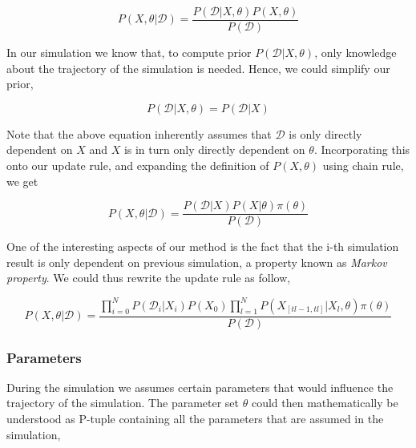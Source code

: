 \documentclass{bioinfo}
\begin{document}
\begin{equation}
P(X, \theta | \mathcal{D}) = \frac{P(\mathcal{D} | X, \theta)  P(X, \theta)}{P(\mathcal{D})}\label{eq:04}
\end{equation}

In our simulation we know that, to compute prior $P(\mathcal{D} | X, \theta)$, only knowledge about the trajectory of the simulation is needed. Hence, we could simplify our prior,

\begin{equation}
P(\mathcal{D} | X, \theta) = P(\mathcal{D} | X)\label{eq:05}
\end{equation}

Note that the above equation inherently assumes that $\mathcal{D}$ is only directly dependent on $X$ and $X$ is in turn only directly dependent on $\theta$. Incorporating this onto our update rule, and expanding the definition of $P(X, \theta)$ using chain rule, we get

\begin{equation}
P(X, \theta | \mathcal{D}) = \frac{P(\mathcal{D} | X)  P(X | \theta) \pi(\theta)}{P(\mathcal{D})}\label{eq:06}
\end{equation}

One of the interesting aspects of our method is the fact that the i-th simulation result is only dependent on previous simulation, a property known as \textit{Markov property}. We could thus rewrite the update rule as follow,



\begin{equation}
P(X, \theta | \mathcal{D}) = \frac{\prod_{i=0}^{N} P(\mathcal{D}_i | X_i) P(X_0) \prod_{l=1}^{N} P(X_{[tl-1, tl]} | X_l, \theta)\pi(\theta)}{P(\mathcal{D})}\label{eq:07}
\end{equation}

\subsubsection{Parameters}

During the simulation we assumes certain parameters that would influence the trajectory of the simulation. The parameter set $\theta$ could then mathematically be understood as P-tuple containing all the parameters that are assumed in the simulation,
\end{document}
